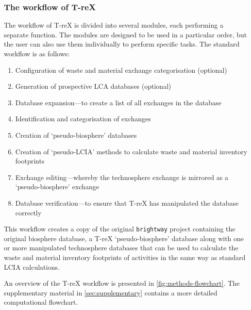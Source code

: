 

\subsubsection{The workflow of T-reX}

The workflow of T-reX is divided into several modules, each performing a separate function. The modules are designed to be used in a particular order, but the user can also use them individually to perform specific tasks. The standard workflow is as follows:

\begin{enumerate}
    \item Configuration of waste and material exchange categorisation (optional)
    \item Generation of prospective LCA databases (optional)
    \item Database expansion---to create a list of all exchanges in the database
    \item Identification and categorisation of exchanges
    \item Creation of `pseudo-biosphere' databases
    \item Creation of `pseudo-LCIA' methods to calculate waste and material inventory footprints
    \item Exchange editing---whereby the technosphere exchange is mirrored as a `pseudo-biosphere' exchange
    \item Database verification---to ensure that T-reX has manipulated the database correctly
\end{enumerate}

This workflow creates a copy of the original \texttt{brightway} project containing the original biosphere database, a T-reX `pseudo-biosphere' database along with one or more manipulated technosphere databases that can be used to calculate the waste and material inventory footprints of activities in the same way as standard LCIA calculations.

An overview of the T-reX workflow is presented in \autoref{fig:methods-flowchart}. The supplementary material in \autoref{sec:supplementary} contains a more detailed computational flowchart.

